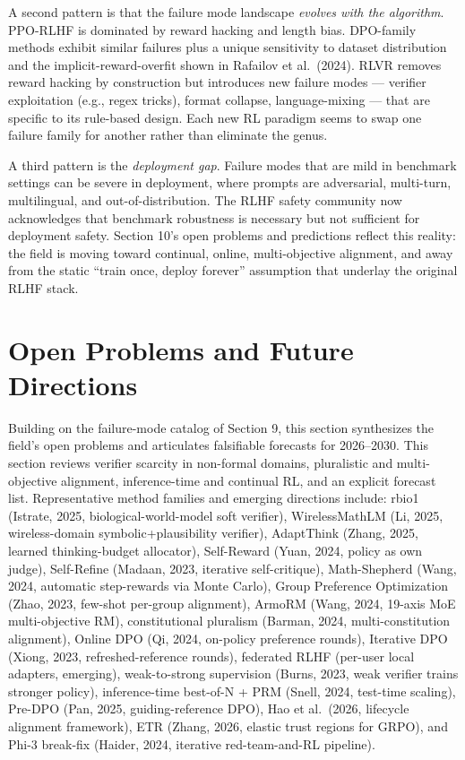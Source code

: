 A second pattern is that the failure mode landscape \emph{evolves with the algorithm}. PPO-RLHF is dominated by reward hacking and length bias. DPO-family methods exhibit similar failures plus a unique sensitivity to dataset distribution and the implicit-reward-overfit shown in Rafailov et al.~(2024). RLVR removes reward hacking by construction but introduces new failure modes --- verifier exploitation (e.g., regex tricks), format collapse, language-mixing --- that are specific to its rule-based design. Each new RL paradigm seems to swap one failure family for another rather than eliminate the genus.

A third pattern is the \emph{deployment gap}. Failure modes that are mild in benchmark settings can be severe in deployment, where prompts are adversarial, multi-turn, multilingual, and out-of-distribution. The RLHF safety community now acknowledges that benchmark robustness is necessary but not sufficient for deployment safety. Section 10's open problems and predictions reflect this reality: the field is moving toward continual, online, multi-objective alignment, and away from the static ``train once, deploy forever'' assumption that underlay the original RLHF stack.

\section{Open Problems and Future Directions}\label{open-problems-and-future-directions}

Building on the failure-mode catalog of Section 9, this section synthesizes the field's open problems and articulates falsifiable forecasts for 2026--2030. This section reviews verifier scarcity in non-formal domains, pluralistic and multi-objective alignment, inference-time and continual RL, and an explicit forecast list. Representative method families and emerging directions include: rbio1 (Istrate, 2025, biological-world-model soft verifier), WirelessMathLM (Li, 2025, wireless-domain symbolic+plausibility verifier), AdaptThink (Zhang, 2025, learned thinking-budget allocator), Self-Reward (Yuan, 2024, policy as own judge), Self-Refine (Madaan, 2023, iterative self-critique), Math-Shepherd (Wang, 2024, automatic step-rewards via Monte Carlo), Group Preference Optimization (Zhao, 2023, few-shot per-group alignment), ArmoRM (Wang, 2024, 19-axis MoE multi-objective RM), constitutional pluralism (Barman, 2024, multi-constitution alignment), Online DPO (Qi, 2024, on-policy preference rounds), Iterative DPO (Xiong, 2023, refreshed-reference rounds), federated RLHF (per-user local adapters, emerging), weak-to-strong supervision (Burns, 2023, weak verifier trains stronger policy), inference-time best-of-N + PRM (Snell, 2024, test-time scaling), Pre-DPO (Pan, 2025, guiding-reference DPO), Hao et al.~(2026, lifecycle alignment framework), ETR (Zhang, 2026, elastic trust regions for GRPO), and Phi-3 break-fix (Haider, 2024, iterative red-team-and-RL pipeline).

